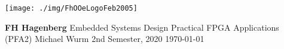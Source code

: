 \thispagestyle{empty} %
\hfill
\texttt{[image: ./img/FhOOeLogoFeb2005]}

\begin{center}
	\textbf{\Large }
	\linebreak
	\linebreak
	\linebreak
	\linebreak
	\linebreak
	\horizontalLine{0.5 mm}
	\linebreak
	\linebreak
	\textbf{\huge \UebungNr}
	\linebreak
	\linebreak
	\linebreak
	\LARGE \UebungTopic
	\linebreak
	\linebreak
	\horizontalLine{0.5 mm}
	\linebreak
	\linebreak
	\linebreak
	\linebreak
	\linebreak
	\linebreak
	\Large {\textbf{FH Hagenberg}}
	\linebreak
	\linebreak
	\Large { Embedded Systems Design }
	\linebreak
	\linebreak
	\Large { Practical FPGA Applications (PFA2) }
	\linebreak
	\linebreak
	\linebreak
	\linebreak
	\linebreak
	\Large {Michael Wurm}
	\linebreak
	\linebreak
	\linebreak
	\linebreak
	\linebreak
	\normalsize{ 2nd Semester, 2020 }
	\linebreak
	\linebreak
	\large{\today}

\end{center}
